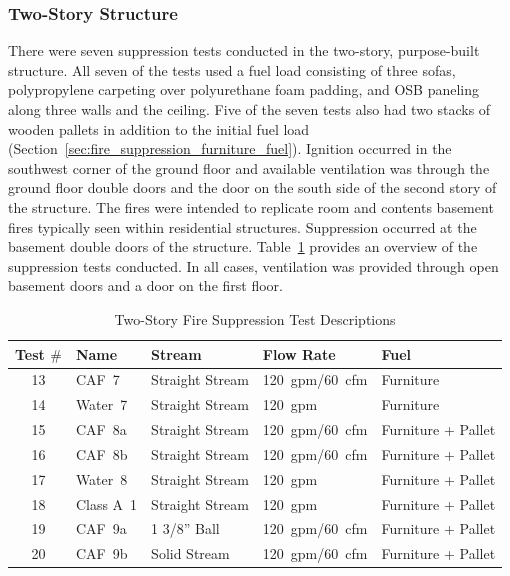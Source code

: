\documentclass[12pt,oneside]{book}
\begin{document}
\subsubsection*{Two-Story Structure}
\label{sec:fire_supp_two}

There were seven suppression tests conducted in the two-story, purpose-built structure. All seven of the tests used a fuel load consisting of three sofas, polypropylene carpeting over polyurethane foam padding, and OSB paneling along three walls and the ceiling. Five of the seven tests also had two stacks of wooden pallets in addition to the initial fuel load (Section~\ref{sec:fire_suppression_furniture_fuel}). Ignition occurred in the southwest corner of the ground floor and available ventilation was through the ground floor double doors and the door on the south side of the second story of the structure. The fires were intended to replicate room and contents basement fires typically seen within residential structures. Suppression occurred at the basement double doors of the structure. Table~\ref{tab:Test_Descriptions_2} provides an overview of the suppression tests conducted. In all cases, ventilation was provided through open basement doors and a door on the first floor.

\begin{table}[!ht]
\centering
\small
\caption{Two-Story Fire Suppression Test Descriptions}\label{tab:Test_Descriptions_2}
\begin{tabular}{cllll}
\toprule[1.5pt]
Test $\#$  & Name	& Stream			& Flow Rate		& Fuel                    \\
\midrule
 13  & CAF~7     &  Straight Stream  	&  120~gpm/60~cfm   & Furniture           \\
 14  & Water~7   &  Straight Stream  	&  120~gpm    		& Furniture           \\
 15  & CAF~8a    &  Straight Stream  	&  120~gpm/60~cfm   & Furniture + Pallet  \\
 16  & CAF~8b    &  Straight Stream  	&  120~gpm/60~cfm   & Furniture + Pallet  \\
 17  & Water~8   &  Straight Stream     &  120~gpm          & Furniture + Pallet  \\
 18  & Class A~1 &  Straight Stream  	&  120~gpm		    & Furniture + Pallet  \\
 19  & CAF~9a    &  1 3/8'' Ball    	&  120~gpm/60~cfm   & Furniture + Pallet  \\
 20  & CAF~9b    &  Solid Stream        &  120~gpm/60~cfm   & Furniture + Pallet  \\
\bottomrule[1.25pt]
\end{tabular}\par
\end{table}
  
\end{document}
